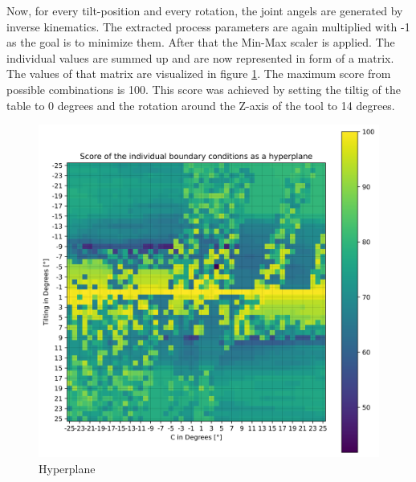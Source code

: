 Now, for every tilt-position and every rotation, the joint angels are generated by inverse kinematics. The extracted process parameters are again multiplied with -1 as the goal is to minimize them. After that the Min-Max scaler is applied. The individual values are summed up and are now represented in form of a matrix. The values of that matrix are visualized in figure \ref{best_2D}. The maximum score from possible combinations is 100. This score was achieved by setting the tiltig of the table to 0 degrees and the rotation around the Z-axis of the tool to 14 degrees.



\begin{figure}[H]
	\centerline{\includegraphics[width=1\textwidth]{figures/best_2D_3.png}}
	\caption{Hyperplane}
	\label{best_2D}
\end{figure}

\newpage
